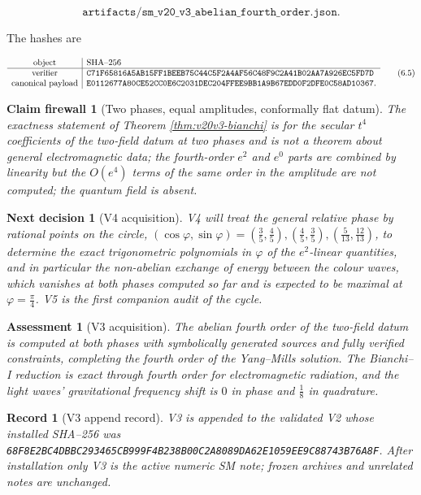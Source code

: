 \documentclass[11pt]{article}
\newtheorem{firewall}[theorem]{Claim firewall}
\newtheorem{decision}[theorem]{Next decision}
\newtheorem{assessment}[theorem]{Assessment}
\newtheorem{record}[theorem]{Record}
\theoremstyle{remark}
\begin{document}
\[
 \texttt{artifacts/sm\_v20\_v3\_abelian\_fourth\_order.json}.          \tag{6.4}
\]

The hashes are

\[
\begin{array}{c|l}
\hbox{object}&\hbox{SHA--256}\\ \hline
\hbox{verifier}&
\texttt{C71F65816A5AB15FF1BEEB75C44C5F2A4AF56C48F9C2A41B02AA7A926EC5FD7D}\\
\hbox{canonical payload}&
\texttt{E0112677A80CE52CC0E6C2031DEC204FFEE9BB1A9B67EDD0F2DFE0C58AD10367}.
\end{array}                                                     \tag{6.5}
\]

\begin{firewall}[Two phases, equal amplitudes, conformally flat datum]
\label{fire:v20v3}
The exactness statement of Theorem \ref{thm:v20v3-bianchi} is for the
secular \(t^4\) coefficients of the two-field datum at two phases and
is not a theorem about general electromagnetic data; the fourth-order
\(e^2\) and \(e^0\) parts are combined by linearity but the
\(O(e^4)\) terms of the same order in the amplitude are not computed;
the quantum field is absent.
\end{firewall}

\begin{decision}[V4 acquisition]
\label{dec:v20v3-next}
V4 will treat the general relative phase by rational points on the
circle, \((\cos\varphi,\sin\varphi)=(\tfrac35,\tfrac45),(\tfrac45,\tfrac35),(\tfrac5{13},\tfrac{12}{13})\),
to determine the exact trigonometric polynomials in \(\varphi\) of the
\(e^2\)-linear quantities, and in particular the non-abelian
exchange of energy between the colour waves, which vanishes at both
phases computed so far and is expected to be maximal at
\(\varphi=\tfrac\pi4\).  V5 is the first companion audit of the cycle.
\end{decision}

\begin{assessment}[V3 acquisition]
\label{ass:v20v3}
The abelian fourth order of the two-field datum is computed at both
phases with symbolically generated sources and fully verified
constraints, completing the fourth order of the Yang--Mills solution.
The Bianchi--I reduction is exact through fourth order for
electromagnetic radiation, and the light waves' gravitational
frequency shift is \(0\) in phase and \(\tfrac18\) in quadrature.
\end{assessment}

\begin{record}[V3 append record]
\label{rec:v20v3}
V3 is appended to the validated V2 whose installed SHA--256 was
\texttt{68F8E2BC4DBBC293465CB999F4B238B00C2A8089DA62E1059EE9C88743B76A8F}.
After installation only V3 is the active numeric SM note; frozen
archives and unrelated notes are unchanged.
\end{record}
\end{document}
